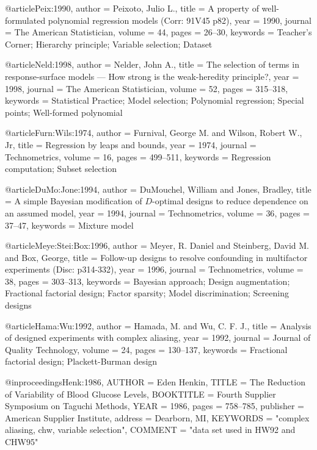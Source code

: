 @article{Peix:1990,
    author = {Peixoto, Julio L.},
    title = {A property of well-formulated polynomial regression models ({C}orr: 91{V}45 p82)},
    year = {1990},
    journal = {The American Statistician},
    volume = {44},
    pages = {26--30},
    keywords = {Teacher's Corner; Hierarchy principle; Variable selection; Dataset}
}

@article{Neld:1998,
    author = {Nelder, John A.},
    title = {The selection of terms in response-surface models --- {H}ow strong is the weak-heredity principle?},
    year = {1998},
    journal = {The American Statistician},
    volume = {52},
    pages = {315--318},
    keywords = {Statistical Practice; Model selection; Polynomial regression; Special points; Well-formed polynomial}
}

@article{Furn:Wils:1974,
    author = {Furnival, George M. and Wilson, Robert W., Jr},
    title = {Regression by leaps and bounds},
    year = {1974},
    journal = {Technometrics},
    volume = {16},
    pages = {499--511},
    keywords = {Regression computation; Subset selection}
}

@article{DuMo:Jone:1994,
    author = {DuMouchel, William and Jones, Bradley},
    title = {A simple {B}ayesian modification of ${D}$-optimal designs to reduce dependence on an assumed model},
    year = {1994},
    journal = {Technometrics},
    volume = {36},
    pages = {37--47},
    keywords = {Mixture model}
}

@article{Meye:Stei:Box:1996,
    author = {Meyer, R. Daniel and Steinberg, David M. and Box, George},
    title = {Follow-up designs to resolve confounding in multifactor experiments ({D}isc: p314-332)},
    year = {1996},
    journal = {Technometrics},
    volume = {38},
    pages = {303--313},
    keywords = {Bayesian approach; Design augmentation; Fractional factorial design; Factor sparsity; Model discrimination; Screening designs}
}

@article{Hama:Wu:1992,
    author = {Hamada, M. and Wu, C. F. J.},
    title = {Analysis of designed experiments with complex aliasing},
    year = {1992},
    journal = {Journal of Quality Technology},
    volume = {24},
    pages = {130--137},
    keywords = {Fractional factorial design; Plackett-Burman design}
}


@inproceedings{Henk:1986,
        AUTHOR = {Eden Henkin},
        TITLE = {The Reduction of Variability of Blood Glucose Levels},
        BOOKTITLE = {Fourth Supplier Symposium on {T}aguchi Methods},
        YEAR = 1986,
        pages = {758--785},
        publisher = {American Supplier Institute},
	address = {Dearborn, MI},
        KEYWORDS = "complex aliasing, chw, variable selection",
        COMMENT = "data set used in HW92 and CHW95"}


